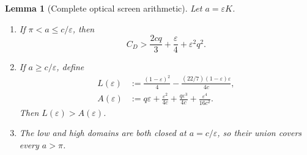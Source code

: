\documentclass[11pt]{article}
\newtheorem{lemma}{Lemma}
\begin{document}
\begin{lemma}[Complete optical screen arithmetic]
\label{lem:optical-screens}
Let \(a=\varepsilon K\).
\begin{enumerate}
\item If \(\pi<a\leq c/\varepsilon\), then
\[
 C_D>
 \frac{2cq}{3}+\frac{\varepsilon}{4}+\varepsilon^2q^2.
 \tag{L}
\]
\item If \(a\geq c/\varepsilon\), define
\begin{align*}
 L(\varepsilon)
 &:=
 \frac{(1-\varepsilon)^2}{4}
 -\frac{(22/7)(1-\varepsilon)\varepsilon}{4c},\\
 A(\varepsilon)
 &:=
 q\varepsilon+\frac{\varepsilon^2}{4c}
 +\frac{q\varepsilon^3}{4c}
 +\frac{\varepsilon^4}{16c^2}.
\end{align*}
Then \(L(\varepsilon)>A(\varepsilon)\).
\item The low and high domains are both closed at
\(a=c/\varepsilon\), so their union covers every \(a>\pi\).
\end{enumerate}
\end{lemma}
\end{document}
